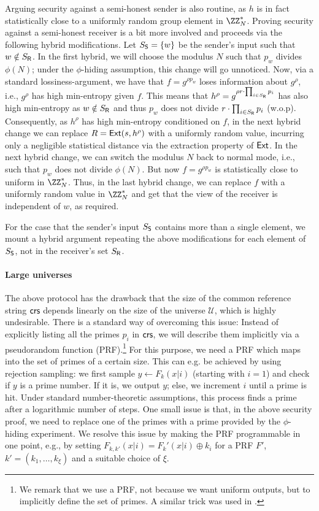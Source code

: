 Arguing security against a semi-honest sender is also routine, as $h$ is in fact statistically close to a uniformly random group element in $\ZZ_N^\ast$. Proving security against a semi-honest receiver is a bit more involved and proceeds via the following hybrid modifications. Let $S_{\mathsf{S}} = \{ w \}$ be the sender's input such that $w \notin S_{\mathsf{R}}$. In the first hybrid, we will choose the modulus $N$ such that $p_w$ divides $\phi(N)$; under the $\phi$-hiding assumption, this change will go unnoticed. Now, via a standard lossiness-argument, we have that $f = g^{\rho p_w}$ loses information about $g^\rho$, i.e., $g^\rho$ has high min-entropy given $f$. This means that $h^\rho = g^{\rho r \cdot \prod_{i \in S_{\mathsf{R}}} p_i}$ has also high min-entropy as $w \notin S_{\mathsf{R}}$ and thus $p_w$ does not divide $r \cdot \prod_{i \in S_{\mathsf{R}}} p_i$ (w.o.p). Consequently, as $h^\rho$ has high min-entropy conditioned on $f$, in the next hybrid change we can replace $R = \mathsf{Ext}(s,h^\rho)$ with a uniformly random value, incurring only a negligible statistical distance via the extraction property of $\mathsf{Ext}$. In the next hybrid change, we can switch the modulus $N$ back to normal mode, i.e., such that $p_w$ does not divide $\phi(N)$. But now $f = g^{\rho p_w}$ is statistically close to uniform in $\ZZ_N^\ast$. Thus, in the last hybrid change, we can replace $f$ with a uniformly random value in $\ZZ_N^\ast$ and get that the view of the receiver is independent of $w$, as required.

For the case that the sender's input $S_{\mathsf{S}}$ contains more than a single element, we mount a hybrid argument repeating the above modifications for each element of $S_{\mathsf{S}}$, not in the receiver's set $S_{\mathsf{R}}$.

\paragraph{Large universes}
The above protocol has the drawback that the size of the common reference string $\mathsf{crs}$ depends linearly on the size of the universe $\mathcal{U}$, which is highly undesirable. There is a standard way of overcoming this issue: Instead of explicitly listing all the primes $p_i$ in $\mathsf{crs}$, we will describe them implicitly via a pseudorandom function (PRF).\footnote{We remark that we use a PRF, not because we want uniform outputs, but to implicitly define the set of primes. A similar trick was used in \cite{C:BoyGilIsh16}.} For this purpose, we need a PRF which maps into the set of primes of a certain size. This can e.g. be achieved by using rejection sampling: we first sample $y\leftarrow F_k(x|i)$ (starting with $i=1$) and check if $y$ is a prime number. If it is, we output $y$; else, we increment $i$ until a prime is hit. Under standard number-theoretic assumptions, this process finds a prime after a logarithmic number of steps. One small issue is that, in the above security proof, we need to replace one of the primes with a prime provided by the $\phi$-hiding experiment. We resolve this issue by making the PRF programmable in one point, e.g., by setting $F_{k,k'}(x|i) = F_k'(x|i) \oplus k_i$ for a PRF $F'$, $k'=(k_1,\dots,k_\xi)$ and a suitable choice of $\xi$.

